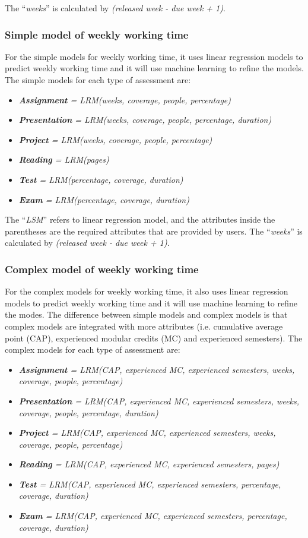 \documentclass[fyp]{socreport}
\begin{document}
The “\textit{weeks}” is calculated by \textit{(released week - due week + 1)}.

\subsubsection{Simple model of weekly working time}
For the simple models for weekly working time, it uses linear regression models to predict weekly working time and it will use machine learning to refine the models. The simple models for each type of assessment are:
\begin{itemize}
	\item \textit{\textbf{Assignment} = LRM(weeks, coverage, people, percentage)}
	\item \textit{\textbf{Presentation} = LRM(weeks, coverage, people, percentage, duration)}
	\item \textit{\textbf{Project} = LRM(weeks, coverage, people, percentage)}
	\item \textit{\textbf{Reading} = LRM(pages)}
	\item \textit{\textbf{Test} = LRM(percentage, coverage, duration)}
	\item \textit{\textbf{Exam} = LRM(percentage, coverage, duration)}
\end{itemize}

The “\textit{LSM}” refers to linear regression model, and the attributes inside the parentheses are the required attributes that are provided by users. The “\textit{weeks}” is calculated by \textit{(released week - due week + 1)}.

\subsubsection{Complex model of weekly working time}
For the complex models for weekly working time, it also uses linear regression models to predict weekly working time and it will use machine learning to refine the modes. The difference between simple models and complex models is that complex models are integrated with more attributes (i.e. cumulative average point (CAP), experienced modular credits (MC) and experienced semesters). The complex models for each type of assessment are:
\begin{itemize}
	\item \textit{\textbf{Assignment} = LRM(CAP, experienced MC, experienced semesters, weeks, coverage, people, percentage)}
	\item \textit{\textbf{Presentation} = LRM(CAP, experienced MC, experienced semesters, weeks, coverage, people, percentage, duration)}
	\item \textit{\textbf{Project} = LRM(CAP, experienced MC, experienced semesters, weeks, coverage, people, percentage)}
	\item \textit{\textbf{Reading} = LRM(CAP, experienced MC, experienced semesters, pages)}
	\item \textit{\textbf{Test} = LRM(CAP, experienced MC, experienced semesters, percentage, coverage, duration)}
	\item \textit{\textbf{Exam} = LRM(CAP, experienced MC, experienced semesters, percentage, coverage, duration)}
\end{itemize}
\end{document}
